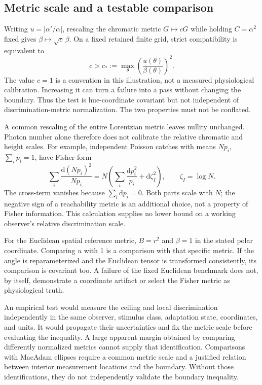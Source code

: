 \documentclass[11pt,letterpaper]{article}
\theoremstyle{plain}
\newcommand{\dd}{\mathrm{d}}
\begin{document}
\subsection{Metric scale and a testable comparison}
Writing $u=|\alpha'/\alpha|$, rescaling the chromatic metric $G\mapsto cG$ while holding $C=\alpha^2$ fixed gives $\beta\mapsto\sqrt c\,\beta$. On a fixed retained finite grid, strict compatibility is equivalent to
\begin{equation}
 c>c_*:=\max_\theta\left(\frac{u(\theta)}{\beta(\theta)}\right)^2.
 \label{eq:scale}
\end{equation}
The value $c=1$ is a convention in this illustration, not a measured physiological calibration. Increasing it can turn a failure into a pass without changing the boundary. Thus the test is hue-coordinate covariant but not independent of discrimination-metric normalization. The two properties must not be conflated.

A common rescaling of the entire Lorentzian metric leaves nullity unchanged. Photon number alone therefore does not calibrate the relative chromatic and height scales. For example, independent Poisson catches with means $Np_i$, $\sum_i p_i=1$, have Fisher form
\begin{equation}
 \sum_i\frac{\dd(Np_i)^2}{Np_i}
 =N\left(\sum_i\frac{\dd p_i^2}{p_i}+\dd\zeta_I^2\right),
 \qquad \zeta_I=\log N.
 \label{eq:poisson-scale}
\end{equation}
The cross-term vanishes because $\sum_i\dd p_i=0$. Both parts scale with $N$; the negative sign of a reachability metric is an additional choice, not a property of Fisher information. This calculation supplies no lower bound on a working observer's relative discrimination scale.

For the Euclidean spatial reference metric, $B=r^2$ and $\beta=1$ in the stated polar coordinate. Comparing $u$ with 1 is a comparison with that specific metric. If the angle is reparameterized and the Euclidean tensor is transformed consistently, its comparison is covariant too. A failure of the fixed Euclidean benchmark does not, by itself, demonstrate a coordinate artifact or select the Fisher metric as physiological truth.

An empirical test would measure the ceiling and local discrimination independently in the same observer, stimulus class, adaptation state, coordinates, and units. It would propagate their uncertainties and fix the metric scale before evaluating the inequality. A large apparent margin obtained by comparing differently normalized metrics cannot supply that identification. Comparisons with MacAdam ellipses \cite{MacAdam1942} require a common metric scale and a justified relation between interior measurement locations and the boundary. Without those identifications, they do not independently validate the boundary inequality.
\end{document}

